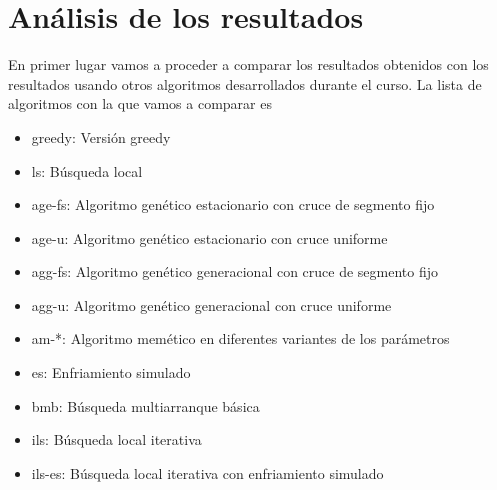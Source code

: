 \documentclass[11pt]{article}
\begin{document}
\section{Análisis de los resultados}

En primer lugar vamos a proceder a comparar los resultados obtenidos con los
resultados usando otros algoritmos desarrollados durante el curso. La lista de
algoritmos con la que vamos a comparar es 

\begin{itemize}
  \item greedy: Versión greedy
  \item ls: Búsqueda local 
  \item age-fs: Algoritmo genético estacionario con cruce de segmento fijo 
  \item age-u: Algoritmo genético estacionario con cruce uniforme
  \item agg-fs: Algoritmo genético generacional con cruce de segmento fijo 
  \item agg-u: Algoritmo genético generacional con cruce uniforme
  \item am-*: Algoritmo memético en diferentes variantes de los parámetros 
  \item es: Enfriamiento simulado
  \item bmb: Búsqueda multiarranque básica
  \item ils: Búsqueda local iterativa
  \item ils-es: Búsqueda local iterativa con enfriamiento simulado
\end{itemize}
\end{document}
